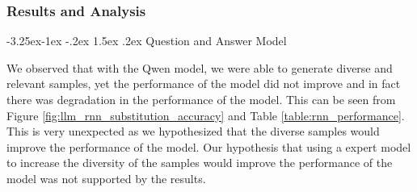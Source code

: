 \documentclass[10pt]{extarticle}
\makeatletter
\renewcommand\paragraph{\@startsection{paragraph}{4}{\z@}%
                                     {-3.25ex\@plus -1ex \@minus -.2ex}%
                                     {1.5ex \@plus .2ex}%
                                     {\normalfont\normalsize\bfseries}}
\makeatother
\begin{document}
\subsubsection{Results and Analysis}

\paragraph{Question and Answer Model}

We observed that with the Qwen model, we were able to generate diverse and
relevant samples, yet the performance of the model did not improve and in fact
there was degradation in the performance of the model. This can be seen from
Figure \ref{fig:llm_rnn_substitution_accuracy} and Table
\ref{table:rnn_performance}. This is very unexpected as we hypothesized that
the diverse samples would improve the performance of the model. Our hypothesis
that using a expert model to increase the diversity of the samples would
improve the performance of the model was not supported by the results.
\end{document}
